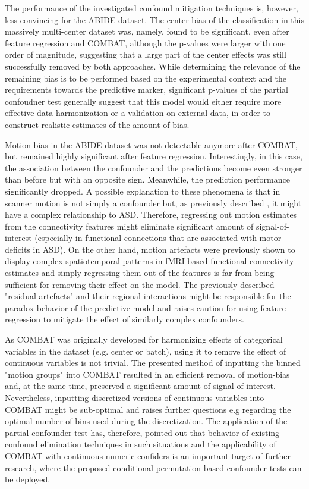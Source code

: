 \documentclass{article}
\begin{document}
The performance of the investigated confound mitigation techniques is, however, less convincing for the ABIDE dataset. The center-bias of the classification in this massively multi-center dataset was, namely, found to be significant, even after feature regression and COMBAT, although the p-values were larger with one order of magnitude, suggesting that a large part of the center effects was still successfully removed by both approaches. While determining the relevance of the remaining bias is to be performed based on the experimental context and the requirements towards the predictive marker, significant p-values of the partial confoudner test generally suggest that this model would either require more effective data harmonization or a validation on external data, in order to construct realistic estimates of the amount of bias.

Motion-bias in the ABIDE dataset was not detectable anymore after COMBAT, but remained highly significant after feature regression.
Interestingly, in this case, the association between the confounder and the predictions become even stronger than before but with an opposite sign. Meanwhile, the prediction performance significantly dropped. 
 A possible explanation to these phenomena is that in scanner motion is not simply a confounder but, as previously described \citep{fournier2010motor, anzulewicz2016toward}, it might have a complex relationship to ASD. Therefore, regressing out motion estimates from the connectivity features might eliminate significant amount of signal-of-interest (especially in functional connections that are associated with motor deficits in ASD).
 On the other hand, motion artefacts were previously shown to display complex spatiotemporal patterns in fMRI-based functional connectivity estimates \cite{spisak2014voxel} and simply regressing them out of the features is far from being sufficient for removing their effect on the model. The previously described "residual artefacts" and their regional interactions might be responsible for the paradox behavior of the predictive model and raises caution for using feature regression to mitigate the effect of similarly complex confounders.
 
 As COMBAT was originally developed for harmonizing effects of categorical variables in the dataset (e.g. center or batch), using it to remove the effect of continuous variables is not trivial. The presented method of inputting the binned "motion groups" into COMBAT resulted in an efficient removal of motion-bias and, at the same time, preserved a significant amount of signal-of-interest. 
 Nevertheless, inputting discretized versions of continuous variables into COMBAT might be sub-optimal and raises further questions e.g regarding the optimal number of bins used during the discretization.
 The application of the partial confounder test has, therefore, pointed out that 
 behavior of existing confound elimination techniques in such situations and the applicability of COMBAT with continuous numeric confiders is an important target of further research, where the proposed conditional permutation based confounder tests can be deployed.
\end{document}
